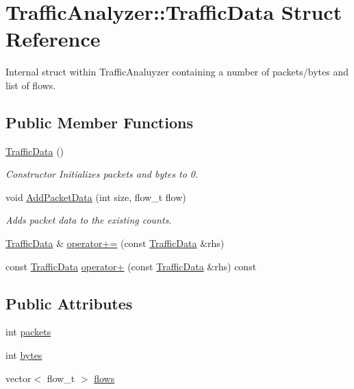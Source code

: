 \hypertarget{structTrafficAnalyzer_1_1TrafficData}{\section{Traffic\-Analyzer\-:\-:Traffic\-Data Struct Reference}
\label{structTrafficAnalyzer_1_1TrafficData}
}


Internal struct within Traffic\-Analuyzer containing a number of packets/bytes and list of flows.  


\subsection*{Public Member Functions}
\begin{DoxyCompactItemize}
\item 
\hypertarget{structTrafficAnalyzer_1_1TrafficData_a3e373b30f721e4b14046a9511d35af89}{\hyperlink{structTrafficAnalyzer_1_1TrafficData_a3e373b30f721e4b14046a9511d35af89}{Traffic\-Data} ()}\label{structTrafficAnalyzer_1_1TrafficData_a3e373b30f721e4b14046a9511d35af89}

\begin{DoxyCompactList}\small\item\em Constructor Initializes packets and bytes to 0. \end{DoxyCompactList}\item 
void \hyperlink{structTrafficAnalyzer_1_1TrafficData_a45f1d719c909021be8a9e8091e4e8da9}{Add\-Packet\-Data} (int size, flow\-\_\-t flow)
\begin{DoxyCompactList}\small\item\em Adds packet data to the existing counts. \end{DoxyCompactList}\item 
\hyperlink{structTrafficAnalyzer_1_1TrafficData}{Traffic\-Data} \& \hyperlink{structTrafficAnalyzer_1_1TrafficData_aa00c8d3955c1a0d52bed31bc2571e72a}{operator+=} (const \hyperlink{structTrafficAnalyzer_1_1TrafficData}{Traffic\-Data} \&rhs)
\item 
const \hyperlink{structTrafficAnalyzer_1_1TrafficData}{Traffic\-Data} \hyperlink{structTrafficAnalyzer_1_1TrafficData_a1b7bc57a523e361535aa9c99ca6397e9}{operator+} (const \hyperlink{structTrafficAnalyzer_1_1TrafficData}{Traffic\-Data} \&rhs) const 
\end{DoxyCompactItemize}
\subsection*{Public Attributes}
\begin{DoxyCompactItemize}
\item 
int \hyperlink{structTrafficAnalyzer_1_1TrafficData_ab71ce320ed4920dcb96ed06048c7b71f}{packets}
\item 
int \hyperlink{structTrafficAnalyzer_1_1TrafficData_a216da5ddb1faa2ee2c900300a532b4df}{bytes}
\item 
vector$<$ flow\-\_\-t $>$ \hyperlink{structTrafficAnalyzer_1_1TrafficData_a76f38620516933ff56687ce8747db952}{flows}
\end{DoxyCompactItemize}


